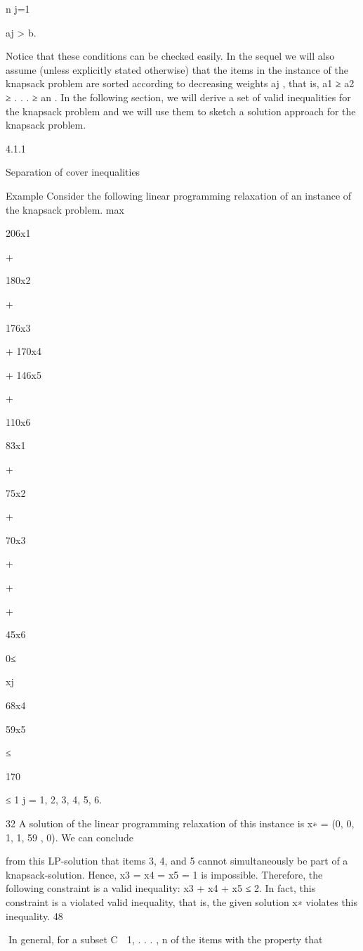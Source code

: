 \documentclass[titlepage]{book}
\theoremstyle{plain}
\theoremstyle{definition}
\theoremstyle{remark}
\begin{document}
n
j=1

aj > b.

Notice that these conditions can be checked easily. In the sequel we will also assume (unless explicitly
stated otherwise) that the items in the instance of the knapsack problem are sorted according to decreasing
weights aj , that is, a1 ≥ a2 ≥ . . . ≥ an . In the following section, we will derive a set of valid inequalities
for the knapsack problem and we will use them to sketch a solution approach for the knapsack problem.

4.1.1

Separation of cover inequalities

Example Consider the following linear programming relaxation of an instance of the knapsack problem.
max

206x1

+

180x2

+

176x3

+ 170x4

+ 146x5

+

110x6

83x1

+

75x2

+

70x3

+

+

+

45x6

0≤

xj

68x4

59x5

≤

170

≤ 1 j = 1, 2, 3, 4, 5, 6.

32
A solution of the linear programming relaxation of this instance is x∗ = (0, 0, 1, 1, 59
, 0). We can conclude

from this LP-solution that items 3, 4, and 5 cannot simultaneously be part of a knapsack-solution. Hence,
x3 = x4 = x5 = 1 is impossible. Therefore, the following constraint is a valid inequality:
x3 + x4 + x5 ≤ 2.
In fact, this constraint is a violated valid inequality, that is, the given solution x∗ violates this inequality.
48

In general, for a subset C ⊆ {1, . . . , n} of the items with the property that
\end{document}

